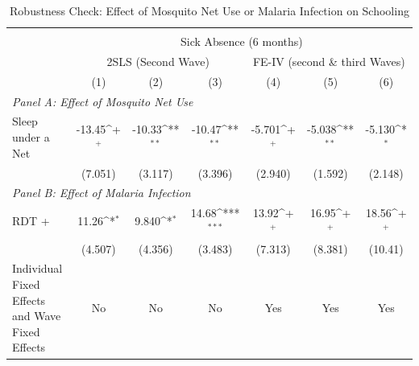 \documentclass[fleqn,11pt]{article}
\newcommand{\sym}[1]{\rlap{$#1$}}
\def\sym#1{\ifmmode^{#1}\else\(^{#1}\)\fi
}
\begin{document}
\begin{table}[h]
\caption{Robustness Check: Effect of Mosquito Net Use or Malaria Infection on Schooling}
\label{latemqnabsence62_child_app}\centering
\begin{adjustbox}{max width=\textwidth}
\begin{threeparttable}
\begin{tabular}{l*{6}{c}}
\hline\hline
                                                                \\
                                                                 &\multicolumn{6}{c}{Sick Absence (6 months)}\\  \cmidrule(lr){2-7}

                                       &\multicolumn{3}{c}{2SLS (Second Wave)}&\multicolumn{3}{c}{FE-IV (second \& third Waves)}\\  \cmidrule(lr){2-4}  \cmidrule(lr){5-7}
                    &\multicolumn{1}{c}{(1)}&\multicolumn{1}{c}{(2)}&\multicolumn{1}{c}{(3)}&\multicolumn{1}{c}{(4)}&\multicolumn{1}{c}{(5)}&\multicolumn{1}{c}{(6)}\\
                       \multicolumn{6}{l}{\textit{Panel A: Effect of Mosquito Net Use}}\\  \hline

Sleep under a Net      &      -13.45\sym{+}  &      -10.33\sym{**} &      -10.47\sym{**} &      -5.701\sym{+}  &      -5.038\sym{**} &      -5.130\sym{*}  \\
                    &     (7.051)         &     (3.117)         &     (3.396)         &     (2.940)         &     (1.592)         &     (2.148)         \\

                       \multicolumn{6}{l}{\textit{Panel B: Effect of Malaria Infection}}\\  \hline

RDT +               &       11.26\sym{*}  &       9.840\sym{*}  &       14.68\sym{***}&       13.92\sym{+}  &       16.95\sym{+}  &       18.56\sym{+}  \\
                    &     (4.507)         &     (4.356)         &     (3.483)         &     (7.313)         &     (8.381)         &     (10.41)         \\

Individual Fixed Effects and Wave Fixed Effects &          No         &          No         &          No         &         Yes         &         Yes         &         Yes         \\


\end{tabular}
\end{threeparttable}
\end{adjustbox}
\end{table}
\end{document}
